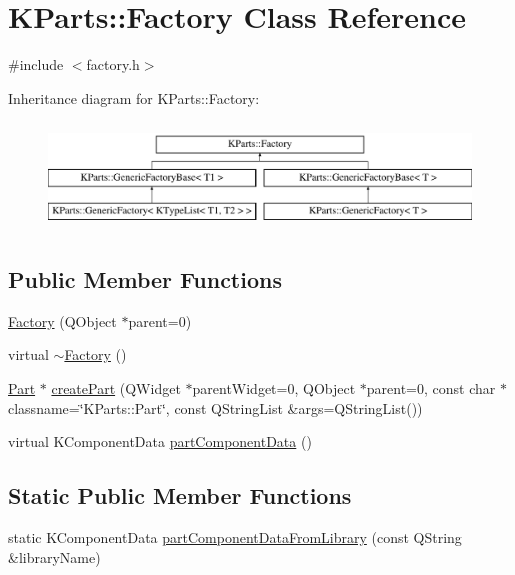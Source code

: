 \hypertarget{classKParts_1_1Factory}{\section{\-K\-Parts\-:\-:\-Factory \-Class \-Reference}
\label{classKParts_1_1Factory}
}


{\ttfamily \#include $<$factory.\-h$>$}

\-Inheritance diagram for \-K\-Parts\-:\-:\-Factory\-:\begin{figure}[H]
\begin{center}
\leavevmode
\includegraphics[height=2.876712cm]{classKParts_1_1Factory}
\end{center}
\end{figure}
\subsection*{\-Public \-Member \-Functions}
\begin{DoxyCompactItemize}
\item 
\hyperlink{classKParts_1_1Factory_aa5b7628de21a0b8b32dcd5bd3b3fe3af}{\-Factory} (\-Q\-Object $\ast$parent=0)
\item 
virtual \hyperlink{classKParts_1_1Factory_a051bbca3a6feb3a865f7e119112ff813}{$\sim$\-Factory} ()
\item 
\hyperlink{classKParts_1_1Part}{\-Part} $\ast$ \hyperlink{classKParts_1_1Factory_a41e7c93ddb621d17b7f380a9455ba2a8}{create\-Part} (\-Q\-Widget $\ast$parent\-Widget=0, \-Q\-Object $\ast$parent=0, const char $\ast$classname=\char`\"{}\-K\-Parts\-::\-Part\char`\"{}, const \-Q\-String\-List \&args=\-Q\-String\-List())
\item 
virtual \-K\-Component\-Data \hyperlink{classKParts_1_1Factory_a94c5c244737f0aa7788a1c114bc2acb9}{part\-Component\-Data} ()
\end{DoxyCompactItemize}
\subsection*{\-Static \-Public \-Member \-Functions}
\begin{DoxyCompactItemize}
\item 
static \-K\-Component\-Data \hyperlink{classKParts_1_1Factory_a5333c938faf8ecd06a172edb4af5692a}{part\-Component\-Data\-From\-Library} (const \-Q\-String \&library\-Name)
\end{DoxyCompactItemize}
